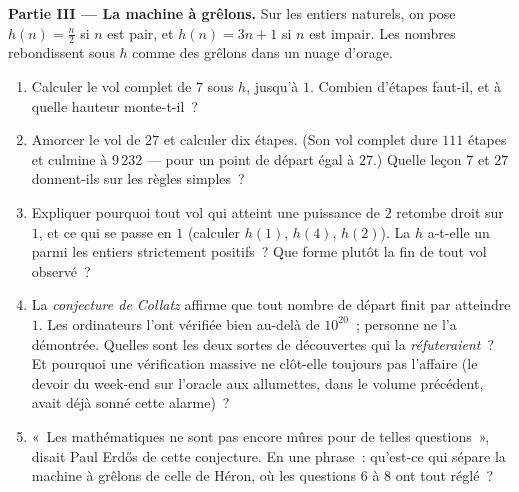 \begin{problem}
\medskip
\noindent\textbf{Partie III --- La machine à grêlons.}
Sur les entiers naturels, on pose $h(n) = \frac n2$ si $n$ est pair,
et $h(n) = 3n + 1$ si $n$ est impair. Les nombres rebondissent sous
$h$ comme des grêlons dans un nuage d'orage.
\begin{enumerate}[resume]
  \item Calculer le vol complet de $7$ sous $h$, jusqu'à $1$. Combien
        d'étapes faut-il, et à quelle hauteur monte-t-il~?
  \item Amorcer le vol de $27$ et calculer dix étapes. (Son vol
        complet dure $111$ étapes et culmine à $9\,232$ --- pour un
        point de départ égal à $27$.) Quelle leçon $7$ et $27$
        donnent-ils sur les règles simples~?
  \item Expliquer pourquoi tout vol qui atteint une puissance de $2$
        retombe droit sur $1$, et ce qui se passe en $1$ (calculer
        $h(1)$, $h(4)$, $h(2)$). La  $h$ a-t-elle un  parmi les entiers strictement positifs~? Que forme
        plutôt la fin de tout vol observé~?
  \item La \emph{conjecture de Collatz} affirme que tout nombre de
        départ finit par atteindre $1$. Les ordinateurs l'ont
        vérifiée bien au-delà de $10^{20}$~; personne ne l'a
        démontrée. Quelles sont les deux sortes de découvertes qui la
        \emph{réfuteraient}~? Et pourquoi une vérification massive ne
        clôt-elle toujours pas l'affaire (le devoir du week-end sur
        l'oracle aux allumettes, dans le volume précédent, avait déjà
        sonné cette alarme)~?
  \item «~Les mathématiques ne sont pas encore mûres pour de telles
        questions~», disait Paul Erd\H{o}s de cette conjecture. En
        une phrase~: qu'est-ce qui sépare la machine à grêlons de
        celle de Héron, où les questions 6 à 8 ont tout réglé~?
\end{enumerate}


\end{problem}
